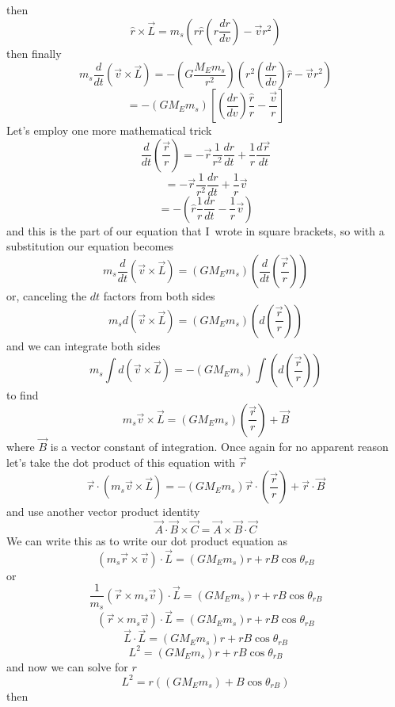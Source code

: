 then 
$$\hat{r}\times \overrightarrow{L}=m_{s}\left( r\hat{r}\left( r\frac{dr}{dv}\right) -\overrightarrow{v}r^{2}\right) $$
then finally 
$$ m_{s}\frac{d}{dt}\left( \overrightarrow{v}\times \overrightarrow{L}\right)=-\left( G\frac{M_{E}m_{s}}{r^{2}}\right) \left( r^{2}\left( \frac{dr}{dv}\right) \hat{r}-\overrightarrow{v}r^{2}\right) 
$$
$$=-\left( GM_{E}m_{s}\right) \left[ \left( \frac{dr}{dv}\right) \frac{\hat{r}}{r}-\frac{\overrightarrow{v}}{r}\right] $$
Let's employ one more mathematical trick
$$\frac{d}{dt}\left( \frac{\overrightarrow{r}}{r}\right) =-\overrightarrow{r} \frac{1}{r^{2}}\frac{dr}{dt}+\frac{1}{r}\frac{d\overrightarrow{r}}{dt}
$$
$$=-\overrightarrow{r}\frac{1}{r^{2}}\frac{dr}{dt}+\frac{1}{r}\overrightarrow{v}
$$
$$=-\left( \hat{r}\frac{1}{r}\frac{dr}{dt}-\frac{1}{r}\overrightarrow{v}\right)$$
and this is the part of our equation that I\ wrote in square brackets, so with a substitution our equation becomes
$$m_{s}\frac{d}{dt}\left( \overrightarrow{v}\times \overrightarrow{L}\right)=\left( GM_{E}m_{s}\right) \left( \frac{d}{dt}\left( \frac{\overrightarrow{r}}{r}\right) \right) $$
or, canceling the $dt$ factors from both sides
$$m_{s}d\left( \overrightarrow{v}\times \overrightarrow{L}\right) =\left(GM_{E}m_{s}\right) \left( d\left( \frac{\overrightarrow{r}}{r}\right)\right)
$$
and we can integrate both sides
$$m_{s}\int d\left( \overrightarrow{v}\times \overrightarrow{L}\right)=-\left( GM_{E}m_{s}\right) \int \left( d\left( \frac{\overrightarrow{r}}{r}\right) \right)
$$
to find 
$$m_{s}\overrightarrow{v}\times \overrightarrow{L}=\left( GM_{E}m_{s}\right)\left( \frac{\overrightarrow{r}}{r}\right) +\overrightarrow{B}
$$
where $\overrightarrow{B}$ is a vector constant of integration. Once again for no apparent reason let's take the dot product of this equation with $\overrightarrow{r}$
$$\overrightarrow{r}\cdot \left( m_{s}\overrightarrow{v}\times \overrightarrow{L}\right) =-\left( GM_{E}m_{s}\right) \overrightarrow{r}\cdot \left( \frac{\overrightarrow{r}}{r}\right) +\overrightarrow{r}\cdot \overrightarrow{B} 
$$
and use another vector product identity
$$\overrightarrow{A}\cdot \overrightarrow{B}\times \overrightarrow{C}=\overrightarrow{A}\times \overrightarrow{B}\cdot \overrightarrow{C} 
$$
We can write this as to write our dot product equation as 
$$\left( m_{s}\overrightarrow{r}\times \overrightarrow{v}\right) \cdot \overrightarrow{L}=\left( GM_{E}m_{s}\right) r+rB\cos \theta _{rB} 
$$
or
$$\frac{1}{m_{s}}\left( \overrightarrow{r}\times m_{s}\overrightarrow{v}\right) \cdot \overrightarrow{L}=\left( GM_{E}m_{s}\right) r+rB\cos \theta_{rB}
$$
$$\left( \overrightarrow{r}\times m_{s}\overrightarrow{v}\right) \cdot \overrightarrow{L}=\left( GM_{E}m_{s}\right) r+rB\cos \theta _{rB} 
$$
$$\overrightarrow{L}\cdot \overrightarrow{L}=\left( GM_{E}m_{s}\right)r+rB\cos \theta _{rB} 
$$
$$L^{2}=\left( GM_{E}m_{s}\right) r+rB\cos \theta _{rB} 
$$
and now we can solve for $r$
$$L^{2}=r\left( \left( GM_{E}m_{s}\right) +B\cos \theta _{rB}\right) 
$$
then 

